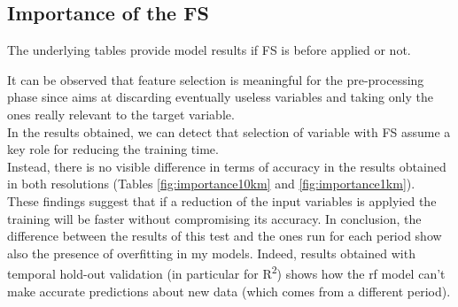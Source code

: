 \subsection{Importance of the FS}
The underlying tables provide model results if FS is before applied or not.

It can be observed that feature selection is meaningful for the pre-processing phase since aims at discarding eventually useless variables and taking only the ones really relevant to the target variable. \\
In the results obtained, we can detect that selection of variable with FS assume a key role for reducing the training time.\\ 
Instead, there is no visible difference in terms of accuracy in the results obtained in both resolutions (Tables \ref{fig:importance10km} and \ref{fig:importance1km}).\\
These findings suggest that if a reduction of the input variables is applyied the training will be faster without compromising its accuracy.
In conclusion, the difference between the results of this test and the ones run for each period show also the presence of overfitting in my models. Indeed, results obtained with temporal hold-out validation (in particular for  R\textsuperscript{2}) shows how the \acrshort{rf} model can't make accurate predictions about new data (which comes from a different period).  

\begin{table}[H]
\centering
{}
\\
\caption{Random Forest prediction for PM2.5, including zones with mountains using or not FS.}
\end{table}